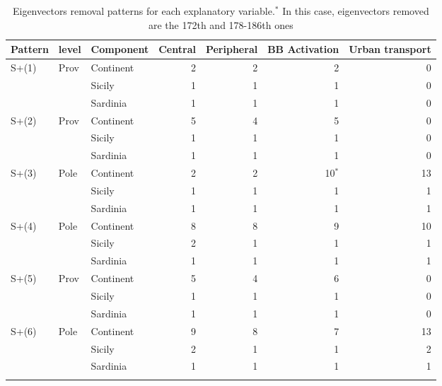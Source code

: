 \documentclass{book}
\begin{document}
\begin{table}[ht]
\begin{tabular}{lll|rrrr}
\toprule
Pattern & level & Component & Central & Peripheral & BB Activation & Urban transport \\
\midrule
\multirow{3}{*}{S+(1)} & \multirow{3}{*}{Prov} & Continent & 2 & 2 & 2 & 0 \\
                       &                       & Sicily & 1 & 1 & 1 & 0 \\
                       &                       & Sardinia & 1 & 1 & 1 & 0 \\
\multirow{3}{*}{S+(2)} & \multirow{3}{*}{Prov} & Continent & 5 & 4 & 5 & 0 \\
                       &                       & Sicily & 1 & 1 & 1 & 0 \\
                       &                       & Sardinia & 1 & 1 & 1 & 0 \\
\multirow{3}{*}{S+(3)} & \multirow{3}{*}{Pole} & Continent & 2 & 2 & 10$^{*}$ & 13 \\
                       &                       & Sicily & 1 & 1 & 1 & 1 \\
                       &                       & Sardinia & 1 & 1 & 1 & 1 \\
\multirow{3}{*}{S+(4)} & \multirow{3}{*}{Pole} & Continent & 8 & 8 & 9 & 10 \\
                       &                       & Sicily & 2 & 1 & 1 & 1 \\
                       &                       & Sardinia & 1 & 1 & 1 & 1 \\
\multirow{3}{*}{S+(5)} & \multirow{3}{*}{Prov} & Continent & 5 & 4 & 6 & 0 \\
                       &                       & Sicily & 1 & 1 & 1 & 0 \\
                       &                       & Sardinia & 1 & 1 & 1 & 0 \\
\multirow{3}{*}{S+(6)} & \multirow{3}{*}{Pole} & Continent & 9 & 8 & 7 & 13 \\
                       &                       & Sicily & 2 & 1 & 1 & 2 \\
                       &                       & Sardinia & 1 & 1 & 1 & 1 \\

\botrule
\end{tabular}
\caption{Eigenvectors removal patterns for each explanatory variable.$^{*}$ In this case, eigenvectors removed are the 172th and 178-186th ones}
\label{tab:eigenremoval}
\end{table}
\end{document}
